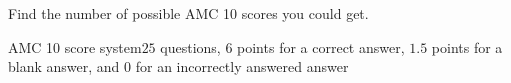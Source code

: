 Find the number of possible AMC 10 scores you could get.



AMC 10 score system$25$ questions, $6$ points for a correct answer, $1.5$ points for a blank answer, and $0$ for an incorrectly answered answer
